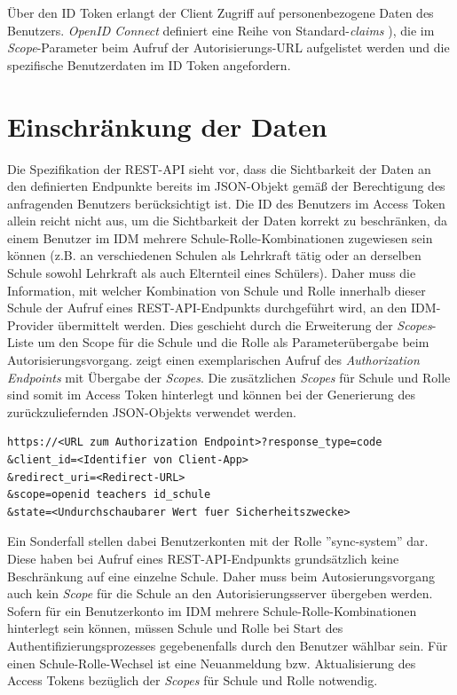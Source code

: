 Über den ID Token erlangt der Client Zugriff auf personenbezogene Daten des Benutzers. 
\textit{OpenID Connect} definiert eine Reihe von Standard-\textit{claims} \cite[Abschnitt~StandardClaims]{OpenID.Core}), die im \textit{Scope}-Parameter beim Aufruf der Autorisierungs-URL aufgelistet werden und die spezifische Benutzerdaten im ID Token angefordern.

\section{Einschränkung der Daten}
\label{auth:limit_data}

Die Spezifikation der REST-API sieht vor, dass die Sichtbarkeit der Daten an den definierten Endpunkte bereits im JSON-Objekt gemäß der Berechtigung des anfragenden Benutzers berücksichtigt ist. 
Die ID des Benutzers im Access Token allein reicht nicht aus, um die Sichtbarkeit der Daten korrekt zu beschränken, da einem Benutzer im IDM mehrere Schule-Rolle-Kombinationen zugewiesen sein können (z.B. an verschiedenen Schulen als Lehrkraft tätig oder an derselben Schule sowohl Lehrkraft als auch Elternteil eines Schülers). 
Daher muss die Information, mit welcher Kombination von Schule und Rolle innerhalb dieser Schule der Aufruf eines REST-API-Endpunkts durchgeführt wird, an den IDM-Provider übermittelt werden. 
Dies geschieht durch die Erweiterung der \textit{Scopes}-Liste um den Scope für die Schule und die Rolle als Parameterübergabe beim Autorisierungsvorgang. 
 zeigt einen exemplarischen Aufruf des \textit{Authorization Endpoints} mit Übergabe der \textit{Scopes}.
Die zusätzlichen \textit{Scopes} für Schule und Rolle sind somit im Access Token hinterlegt und können bei der Generierung des zurückzuliefernden JSON-Objekts verwendet werden.

\begin{lstlisting}[caption={Beispielhafter Aufruf des Authorization Endpoints},label={listing:authorization_request},frame=tlrb]
https://<URL zum Authorization Endpoint>?response_type=code
&client_id=<Identifier von Client-App>
&redirect_uri=<Redirect-URL>
&scope=openid teachers id_schule
&state=<Undurchschaubarer Wert fuer Sicherheitszwecke>
\end{lstlisting}

Ein Sonderfall stellen dabei Benutzerkonten mit der Rolle ''sync-system'' dar. 
Diese haben bei Aufruf eines REST-API-Endpunkts grundsätzlich keine Beschränkung auf eine einzelne Schule. 
Daher muss beim Autosierungsvorgang auch kein \textit{Scope} für die Schule an den Autorisierungsserver übergeben werden. \\

Sofern für ein Benutzerkonto im IDM mehrere Schule-Rolle-Kombinationen hinterlegt sein können, müssen Schule und Rolle bei Start des Authentifizierungsprozesses gegebenenfalls durch den Benutzer wählbar sein. 
Für einen Schule-Rolle-Wechsel ist eine Neuanmeldung bzw. Aktualisierung des Access Tokens bezüglich der \textit{Scopes} für Schule und Rolle notwendig.